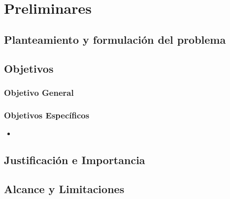 \chapter{Preliminares}

\section{Planteamiento y formulaci\'on del problema}






\section{Objetivos}

\subsection{Objetivo General}



\subsection{Objetivos Espec\'ificos}
 
\begin{itemize}
\item  
\end{itemize}

\section{Justificaci\'on e Importancia}

	
	
\section{Alcance y Limitaciones}

